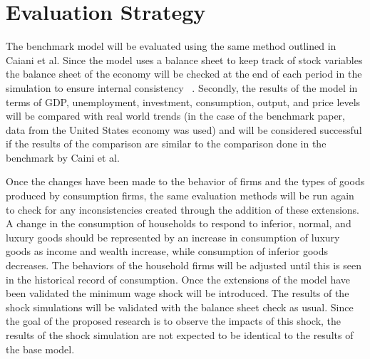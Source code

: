 \documentclass[11pt]{article}
\begin{document}
\section{Evaluation Strategy}
\label{sec:evaluate}

The benchmark model will be evaluated using the same method outlined in Caiani
et al. Since the model uses a balance sheet to keep track of stock variables
the balance sheet of the economy will be checked at the end of each period in
the simulation to ensure internal consistency  ~\cite{Caiani-benchmark-paper}.
Secondly, the results of the model in terms of GDP, unemployment, investment,
consumption, output, and price levels will be compared with real world trends
(in the case of the benchmark paper, data from the United States economy was used)
and will be considered successful if the results of the comparison are similar
to the comparison done in the benchmark by Caini et al.

Once the changes have been made to the behavior of firms and the types of goods
produced by consumption firms, the same evaluation methods will be run again to
check for any inconsistencies created through the addition of these extensions.
A change in the consumption of households to respond to inferior, normal, and
luxury goods should be represented by an increase in consumption of luxury goods
as income and wealth increase, while consumption of inferior goods decreases.
The behaviors of the household firms will be adjusted until this is seen in the
historical record of consumption. Once the extensions of the model have been
validated the minimum wage shock will be introduced. The results of the shock
simulations will be validated with the balance sheet check as usual. Since the
goal of the proposed research is to observe the impacts of this shock, the results
of the shock simulation are not expected to be identical to the results of the
base model.


\end{document}

